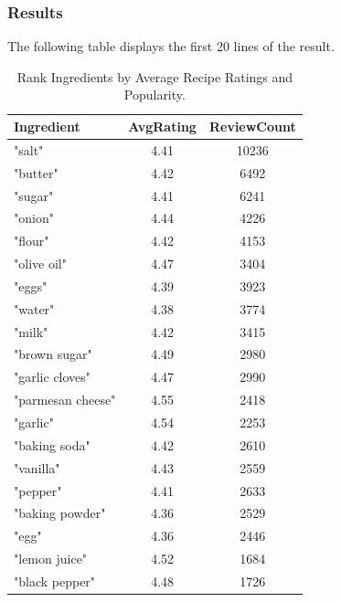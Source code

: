 \begin{enumerate}
    \subsubsection{Results}
    The following table displays the first 20 lines of the result.
    \begin{table}[h!]
\small %
\centering
\begin{tabularx}{\textwidth}{>{\raggedright\arraybackslash}Xcc}
\toprule
\textbf{Ingredient} & \textbf{AvgRating} & \textbf{ReviewCount} \\
\midrule
"salt"               & 4.41 & 10236 \\
"butter"             & 4.42 & 6492 \\
"sugar"              & 4.41 & 6241 \\
"onion"              & 4.44 & 4226 \\
"flour"              & 4.42 & 4153 \\
"olive oil"          & 4.47 & 3404 \\
"eggs"               & 4.39 & 3923 \\
"water"              & 4.38 & 3774 \\
"milk"               & 4.42 & 3415 \\
"brown sugar"        & 4.49 & 2980 \\
"garlic cloves"      & 4.47 & 2990 \\
"parmesan cheese"    & 4.55 & 2418 \\
"garlic"             & 4.54 & 2253 \\
"baking soda"        & 4.42 & 2610 \\
"vanilla"            & 4.43 & 2559 \\
"pepper"             & 4.41 & 2633 \\
"baking powder"      & 4.36 & 2529 \\
"egg"                & 4.36 & 2446 \\
"lemon juice"        & 4.52 & 1684 \\
"black pepper"       & 4.48 & 1726 \\
\bottomrule
\end{tabularx}
\caption{Rank Ingredients by Average Recipe Ratings and Popularity.}
\label{tab:ingredient_data}
\end{table}


\end{enumerate}
